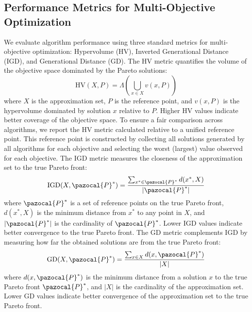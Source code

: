 \documentclass[a4paper,fleqn]{cas-sc}
\begin{document}
\subsection{Performance Metrics for Multi-Objective Optimization}\label{app:metrics}
We evaluate algorithm performance using three standard metrics for multi-objective optimization: Hypervolume (HV), Inverted Generational Distance (IGD), and Generational Distance (GD). 
%
The HV metric quantifies the volume of the objective space dominated by the Pareto solutions:
\begin{equation}
\text{HV}(X, P) = \Lambda \left( \bigcup_{x \in X} v(x, P) \right)
\end{equation}
where $X$ is the approximation set, $P$ is the reference point, and $v(x, P)$ is the hypervolume dominated by solution $x$ relative to $P$. Higher HV values indicate better coverage of the objective space. 
%
To ensure a fair comparison across algorithms, we report the HV metric calculated relative to a unified reference point. 
This reference point is constructed by collecting all solutions generated by all algorithms for each objective and selecting the worst (largest) value observed for each objective. 
%
The IGD metric measures the closeness of the approximation set to the true Pareto front:
\begin{equation}
\text{IGD}(X, \pazocal{P}^*) = \frac{\sum_{x^* \in \pazocal{P}^*} d(x^*, X)}{|\pazocal{P}^*|}
\end{equation}
where $\pazocal{P}^*$ is a set of reference points on the true Pareto front, $d(x^*, X)$ is the minimum distance from $x^*$ to any point in $X$, and $|\pazocal{P}^*|$ is the cardinality of $\pazocal{P}^*$. Lower IGD values indicate better convergence to the true Pareto front.
%
The GD metric complements IGD by measuring how far the obtained solutions are from the true Pareto front:
\begin{equation}
\text{GD}(X, \pazocal{P}^*) = \frac{\sum_{x \in X} d(x, \pazocal{P}^*)}{|X|}
\end{equation}
where $d(x, \pazocal{P}^*)$ is the minimum distance from a solution $x$ to the true Pareto front $\pazocal{P}^*$, and $|X|$ is the cardinality of the approximation set. Lower GD values indicate better convergence of the approximation set to the true Pareto front.
\end{document}
